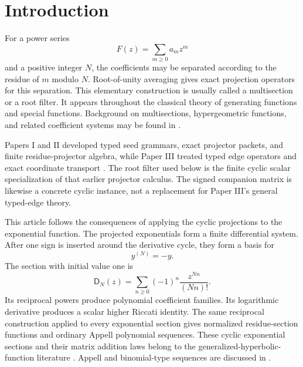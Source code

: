 \documentclass[11pt]{article}
\theoremstyle{definition}
\theoremstyle{remark}
\newcommand{\Dfun}{\mathsf D}
\begin{document}
\clearpage
\tableofcontents
\clearpage

\section{Introduction}\label{sec:introduction}

For a power series
\[
F(z)=\sum_{m\geq 0}a_mz^m
\]
and a positive integer $N$, the coefficients may be separated according to the residue of $m$ modulo $N$.  Root-of-unity averaging gives exact projection operators for this separation.  This elementary construction is usually called a multisection or a root filter.  It appears throughout the classical theory of generating functions and special functions.  Background on multisections, hypergeometric functions, and related coefficient systems may be found in \cite{Rainville1960,AndrewsAskeyRoy1999,Comtet1974}.

Papers I and II developed typed seed grammars, exact projector packets, and
finite residue-projector algebra, while Paper III treated typed edge operators
and exact coordinate transport \cite{PaperI2026,PaperII2026,PaperIII2026}.
The root filter used below is the finite cyclic scalar specialization of that
earlier projector calculus. The signed companion matrix is likewise a concrete
cyclic instance, not a replacement for Paper III's general typed-edge theory.

This article follows the consequences of applying the cyclic projections to the exponential function.  The projected exponentials form a finite differential system.  After one sign is inserted around the derivative cycle, they form a basis for
\[
y^{(N)}=-y.
\]
The section with initial value one is
\[
\Dfun_N(z)=\sum_{n\geq 0}(-1)^n\frac{z^{Nn}}{(Nn)!}.
\]
Its reciprocal powers produce polynomial coefficient families. Its logarithmic
derivative produces a scalar higher Riccati identity. The same reciprocal
construction applied to every exponential section gives normalized
residue-section functions and ordinary Appell polynomial sequences. These
cyclic exponential sections and their matrix addition laws belong to the
generalized-hyperbolic-function literature
\cite{Schwaiger1992,Muldoon2005}. Appell and binomial-type sequences are
discussed in \cite{Roman1984,Comtet1974}.
\end{document}

